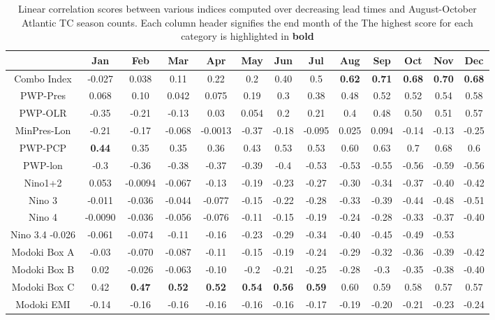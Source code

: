 \documentclass[]{article}
\begin{document}
\begin{table}
	\hspace*{-3.5cm}
\begin{tabular}{ccccccccccccc}
\hline
& Jan & Feb & Mar & Apr & May & Jun & Jul & Aug & Sep & Oct & Nov & Dec\\
\hline
Combo Index & -0.027 & 0.038 & 0.11 & 0.22 & 0.2 & 0.40 & 0.5 & \textbf{0.62} & \textbf{0.71} & \textbf{0.68} & \textbf{0.70} & \textbf{0.68}\\
PWP-Pres &0.068 & 0.10 & 0.042 & 0.075 & 0.19 & 0.3 & 0.38 & 0.48 & 0.52 & 0.52 & 0.54 & 0.58\\
PWP-OLR   & -0.35 & -0.21 & -0.13 & 0.03 & 0.054 & 0.2 & 0.21 & 0.4 & 0.48 & 0.50 & 0.51 & 0.57\\
MinPres-Lon & -0.21 & -0.17 & -0.068 & -0.0013 & -0.37 & -0.18 & -0.095 & 0.025 & 0.094 & -0.14 & -0.13 & -0.25\\
PWP-PCP  & \textbf{0.44} & 0.35 & 0.35 & 0.36 & 0.43 & 0.53 & 0.53 & 0.60 & 0.63 & 0.7 & 0.68 & 0.6\\
PWP-lon & -0.3 & -0.36 & -0.38 & -0.37 & -0.39 & -0.4 & -0.53 & -0.53 & -0.55 & -0.56 & -0.59 & -0.56\\
Nino1+2  & 0.053 & -0.0094 & -0.067 & -0.13 & -0.19 & -0.23 & -0.27 & -0.30 & -0.34 & -0.37 & -0.40 & -0.42\\
Nino 3 & -0.011 & -0.036 & -0.044 & -0.077 & -0.15 & -0.22 & -0.28 & -0.33 & -0.39 & -0.44 & -0.48 & -0.51\\
Nino 4 & -0.0090 & -0.036 & -0.056 & -0.076 & -0.11 & -0.15 & -0.19 & -0.24 & -0.28 & -0.33 & -0.37 & -0.40\\
Nino 3.4  -0.026 & -0.061 & -0.074 & -0.11 & -0.16 & -0.23 & -0.29 & -0.34 & -0.40 & -0.45 & -0.49 & -0.53\\
Modoki Box A  & -0.03 & -0.070 & -0.087 & -0.11 & -0.15 & -0.19 & -0.24 & -0.29 & -0.32 & -0.36 & -0.39 & -0.42\\
Modoki Box B & 0.02 & -0.026 & -0.063 & -0.10 & -0.2 & -0.21 & -0.25 & -0.28 & -0.3 & -0.35 & -0.38 & -0.40\\
Modoki Box C & 0.42 & \textbf{0.47} & \textbf{0.52} & \textbf{0.52} & \textbf{0.54} & \textbf{0.56} & \textbf{0.59} & 0.60 & 0.59 & 0.58 & 0.57 & 0.57\\
Modoki EMI & -0.14 & -0.16 & -0.16 & -0.16 & -0.16 & -0.16 & -0.17 & -0.19 & -0.20 & -0.21 & -0.23 & -0.24\\
\hline
\end{tabular}
\caption{Linear correlation scores between various indices computed over decreasing lead times and August-October Atlantic TC season counts. Each column header signifies the end month of the The highest score for each category is highlighted in \textbf{bold}}
\label{ref:lead_tc}
\end{table}
\end{document}
